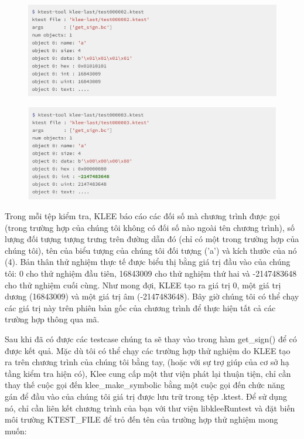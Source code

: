 \documentclass[12pt,a4paper]{article}
\begin{document}
\begin{figure}[ht]
\begin{center}
\includegraphics[scale=.3]{hinhanh/test2.png}
\end{center}
\end{figure}
\newpage
\begin{figure}[ht]
\begin{center}
\includegraphics[scale=.3]{hinhanh/test3.png}
\end{center}
\end{figure}

Trong mỗi tệp kiểm tra, KLEE báo cáo các đối số mà chương trình được gọi (trong trường hợp của chúng tôi không có đối số nào ngoài tên chương trình), số lượng đối tượng tượng trưng trên đường dẫn đó (chỉ có một trong trường hợp của chúng tôi), tên của biểu tượng của chúng tôi đối tượng ('a') và kích thước của nó (4). Bản thân thử nghiệm thực tế được biểu thị bằng giá trị đầu vào của chúng tôi: 0 cho thử nghiệm đầu tiên, 16843009 cho thử nghiệm thứ hai và -2147483648 cho thử nghiệm cuối cùng. Như mong đợi, KLEE tạo ra giá trị 0, một giá trị dương (16843009) và một giá trị âm (-2147483648). Bây giờ chúng tôi có thể chạy các giá trị này trên phiên bản gốc của chương trình để thực hiện tất cả các trường hợp thông qua mã.

Sau khi đã có được các testcase chúng ta sẽ thay vào trong hàm get\_sign() để có được kết quả. Mặc dù tôi có thể chạy các trường hợp thử nghiệm do KLEE tạo ra trên chương trình của chúng tôi bằng tay, (hoặc với sự trợ giúp của cơ sở hạ tầng kiểm tra hiện có), Klee cung cấp một thư viện phát lại thuận tiện, chỉ cần thay thế cuộc gọi đến klee\_make\_symbolic bằng một cuộc gọi đến chức năng gán để đầu vào của chúng tôi giá trị được lưu trữ trong tệp .ktest. Để sử dụng nó, chỉ cần liên kết chương trình của bạn với thư viện libkleeRuntest và đặt biến môi trường KTEST\_FILE để trỏ đến tên của trường hợp thử nghiệm mong muốn:
\end{document}
